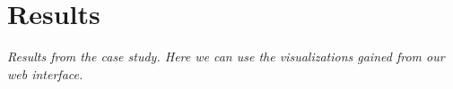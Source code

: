
\chapter{Results}

\textit{Results from the case study.
Here we can use the visualizations gained from our web interface.}

\cleardoublepage